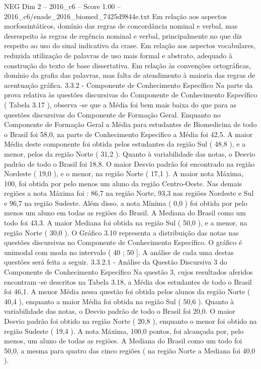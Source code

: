 \begin{textsample}{NEG Dim 2 – 2016\_c6 – Score 1.00 – 2016\_c6/enade\_2016\_biomed\_7425d9844e.txt}
Em relação aos aspectos morfossintáticos, domínio das regras de concordância nominal e verbal, mas desrespeito às regras de regência nominal e verbal, principalmente no que diz respeito ao uso do sinal indicativo da crase.
Em relação aos aspectos vocabulares, reduzida utilização de palavras de uso mais formal e abstrato, adequado à construção do texto de base dissertativa.
Em relação às convenções ortográficas, domínio da grafia das palavras, mas falta de atendimento à maioria das regras de acentuação gráfica. 3.3.2 - Componente de Conhecimento Específico Na parte da prova relativa às questões discursivas do Componente de Conhecimento Específico ( Tabela 3.17 ), observa -se que a Média foi bem mais baixa do que para as questões discursivas do Componente de Formação Geral.
Enquanto no Componente de Formação Geral a Média para estudantes de Biomedicina de todo o Brasil foi 58,0, na parte de Conhecimento Específico a Média foi 42,5.
A maior Média deste componente foi obtida pelos estudantes da região Sul ( 48,8 ), e a menor, pelos da região Norte ( 31,2 ).
Quanto à variabilidade das notas, o Desvio padrão de todo o Brasil foi 18,8.
O maior Desvio padrão foi encontrado na região Nordeste ( 19,0 ), e o menor, na região Norte ( 17,1 ).
A maior nota Máxima, 100, foi obtida por pelo menos um aluno da região Centro-Oeste.
Nas demais regiões a nota Máxima foi : 86,7 na região Norte, 93,3 nas regiões Nordeste e Sul e 96,7 na região Sudeste.
Além disso, a nota Mínima ( 0,0 ) foi obtida por pelo menos um aluno em todas as regiões do Brasil.
A Mediana do Brasil como um todo foi 43,3.
A maior Mediana foi obtida na região Sul ( 50,0 ), e a menor, na região Norte ( 30,0 ).
O Gráfico 3.10 representa a distribuição das notas nas questões discursivas no Componente de Conhecimento Específico.
O gráfico é unimodal com moda no intervalo ( 40 ; 50 ].
A análise de cada uma destas questões será feita a seguir. 3.3.2.1 - Análise da Questão Discursiva 3 do Componente de Conhecimento Específico Na questão 3, cujos resultados aferidos encontram -se descritos na Tabela 3.18, a Média dos estudantes de todo o Brasil foi 46,1.
A menor Média nessa questão foi obtida pelos alunos da região Norte ( 40,4 ), enquanto a maior Média foi obtida na região Sul ( 50,6 ).
Quanto à variabilidade das notas, o Desvio padrão de todo o Brasil foi 20,0.
O maior Desvio padrão foi obtido na região Norte ( 20,8 ), enquanto o menor foi obtido na região Sudeste ( 19,4 ).
A nota Máxima, 100,0 pontos, foi alcançada por, pelo menos, um aluno de todas as regiões.
A Mediana do Brasil como um todo foi 50,0, a mesma para quatro das cinco regiões ( na região Norte a Mediana foi 40,0 ).

\end{textsample}
